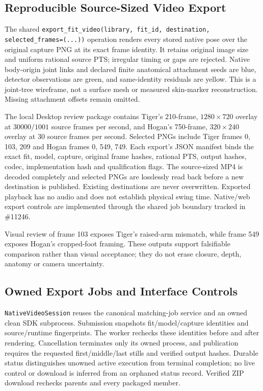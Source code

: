 \documentclass[11pt,letterpaper]{article}
\newcommand{\code}[1]{\nolinkurl{#1}}
\begin{document}
\subsection{Reproducible Source-Sized Video Export}
The shared \code{export_fit_video(library, fit_id, destination,
selected_frames=(...))} operation renders every stored native pose over the
original capture PNG at its exact frame identity. It retains original image
size and uniform rational source PTS; irregular timing or gaps are rejected.
Native body-origin joint links and declared finite anatomical attachment
seeds are blue, detector observations are green, and same-identity residuals
are yellow. This is a joint-tree wireframe, not a surface mesh or measured
skin-marker reconstruction. Missing attachment offsets remain omitted.

The local Desktop review package contains Tiger's 210-frame, $1280\times720$
overlay at $30000/1001$ source frames per second, and Hogan's 750-frame,
$320\times240$ overlay at 30 source frames per second. Selected PNGs include
Tiger frames 0, 103, 209 and Hogan frames 0, 549, 749. Each export's JSON
manifest binds the exact fit, model, capture, original frame hashes, rational
PTS, output hashes, codec, implementation hash and qualification flags.
The source-sized MP4 is decoded completely and selected PNGs are losslessly
read back before a new destination is published. Existing destinations are
never overwritten. Exported playback has no audio and does not establish
physical swing time. Native/web export controls are implemented through the shared job boundary
tracked in \#11246.

Visual review of frame 103 exposes Tiger's raised-arm mismatch, while frame
549 exposes Hogan's cropped-foot framing. These outputs support falsifiable
comparison rather than visual acceptance; they do not erase closure, depth,
anatomy or camera uncertainty.

\subsection{Owned Export Jobs and Interface Controls}
\code{NativeVideoSession} reuses the canonical matching-job service and an
owned clean SDK subprocess. Submission snapshots fit/model/capture identities
and source/runtime fingerprints. The worker rechecks these identities before
and after rendering. Cancellation terminates only its owned process, and
publication requires the requested first/middle/last stills and verified output
hashes. Durable status distinguishes unowned active execution from terminal
completion; no live control or download is inferred from an orphaned status
record. Verified ZIP download rechecks parents and every packaged member.
\end{document}
